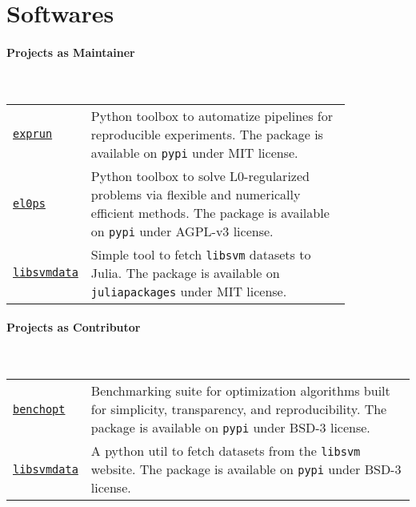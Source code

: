\section{Softwares}

\paragraph*{Projects as Maintainer}~\\

\begin{longtable}[l]{@{}p{.125\linewidth}p{0.845\linewidth}}
    \href{https://github.com/TheoGuyard/ExpFlow/tree/main}{\texttt{exprun}} & Python toolbox to automatize pipelines for reproducible experiments. The package is available on \texttt{pypi} under MIT license.\\
    \href{https://github.com/TheoGuyard/El0ps/tree/main}{\texttt{el0ps}} & Python toolbox to solve L0-regularized problems via flexible and numerically efficient methods. The package is available on \texttt{pypi} under AGPL-v3 license. \\
    \href{https://github.com/TheoGuyard/LIBSVMdata.jl}{\texttt{libsvmdata}} & Simple tool to fetch \texttt{libsvm} datasets to Julia. The package is available on \texttt{juliapackages} under MIT license.
\end{longtable}

\paragraph*{Projects as Contributor}~\\

\begin{longtable}[l]{@{}p{}p{}}
    \href{https://github.com/benchopt/benchopt}{\texttt{benchopt}} & Benchmarking suite for optimization algorithms built for simplicity, transparency, and reproducibility. The package is available on \texttt{pypi} under BSD-3 license. \\
    \href{https://github.com/mathurinm/libsvmdata}{\texttt{libsvmdata}} & A python util to fetch datasets from the \texttt{libsvm} website. The package is available on \texttt{pypi} under BSD-3 license. \\
\end{longtable}
